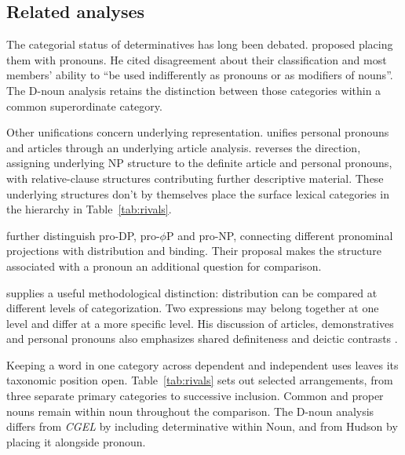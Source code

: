 \documentclass[12pt]{article}
\begin{document}
\subsection{Related analyses}\label{sec:related}

The categorial status of determinatives has long been debated. \textcite[24]{palmer1924} proposed placing them with pronouns. He cited disagreement about their classification and most members' ability to \enquote{be used indifferently as pronouns or as modifiers of nouns}. The D-noun analysis retains the distinction between those categories within a common superordinate category.

Other unifications concern underlying representation. \textcite{postal1966} unifies personal pronouns and articles through an underlying article analysis. \textcite[197--203]{sommerstein1972} reverses the direction, assigning underlying NP structure to the definite article and personal pronouns, with relative-clause structures contributing further descriptive material. These underlying structures don't by themselves place the surface lexical categories in the hierarchy in Table~\ref{tab:rivals}.

\textcite{dechainewiltschko2002} further distinguish pro-DP, pro-$\phi$P and pro-NP, connecting different pronominal projections with distribution and binding. Their proposal makes the structure associated with a pronoun an additional question for comparison.

\textcite[232--235]{lyons1968} supplies a useful methodological distinction: distribution can be compared at different levels of categorization. Two expressions may belong together at one level and differ at a more specific level. His discussion of articles, demonstratives and personal pronouns also emphasizes shared definiteness and deictic contrasts \citep[279]{lyons1968}.

Keeping a word in one category across dependent and independent uses leaves its taxonomic position open. Table~\ref{tab:rivals} sets out selected arrangements, from three separate primary categories to successive inclusion. Common and proper nouns remain within noun throughout the comparison. The D-noun analysis differs from \textit{CGEL} by including determinative within Noun, and from Hudson by placing it alongside pronoun.
\end{document}
